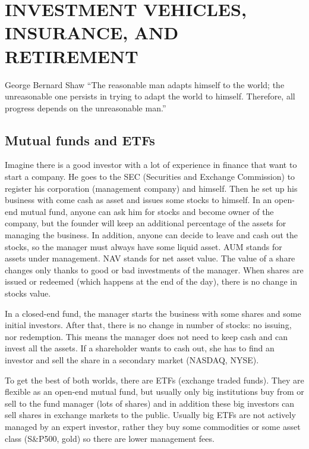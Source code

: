 \chapter{INVESTMENT VEHICLES, INSURANCE, AND RETIREMENT}
\begin{chapquote}{George Bernard Shaw}
``The reasonable man adapts himself to the world; the unreasonable one persists in trying to adapt the world to himself. Therefore, all progress depends on the unreasonable man.''
\end{chapquote}

\section{Mutual funds and ETFs}
Imagine there is a good investor with a lot of experience in finance that want to start a company. He goes to the SEC (Securities and Exchange Commission) to register his corporation (management company) and himself. Then he set up his business with come cash as asset and issues some stocks to himself. In an open-end mutual fund, anyone can ask him for stocks and become owner of the company, but the founder will keep an additional percentage of the assets for managing the business. In addition, anyone can decide to leave and cash out the stocks, so the manager must always have some liquid asset. AUM stands for assets under management. NAV stands for net asset value. The value of a share changes only thanks to good or bad investments of the manager. When shares are issued or redeemed (which happens at the end of the day), there is no change in stocks value. 

In a closed-end fund, the manager starts the business with some shares and some initial investors. After that, there is no change in number of stocks: no issuing, nor redemption. This means the manager does not need to keep cash and can invest all the assets. If a shareholder wants to cash out, she has to find an investor and sell the share in a secondary market (NASDAQ, NYSE).

To get the best of both worlds, there are ETFs (exchange traded funds). They are flexible as an open-end mutual fund, but usually only big institutions buy from or sell to the fund manager (lots of shares) and in addition these big investors can sell shares in exchange markets to the public. Usually big ETFs are not actively managed by an expert investor, rather they buy some commodities or some asset class (S\&P500, gold) so there are lower management fees.

